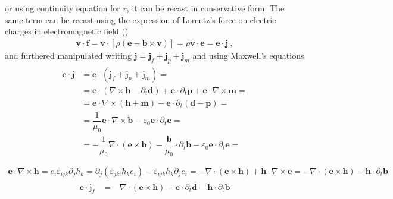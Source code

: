 \documentclass[letterpaper,10pt,italian]{jupyterBook}
\begin{document}
\sphinxAtStartPar
or using continuity equation for \(r\), it can be recast in conservative form. The same term can be recast using the expression of Lorentz’s force on electric charges in electromagnetic field ()
\begin{equation*}
\begin{split}\mathbf{v} \cdot \mathbf{f} = \mathbf{v} \cdot \left[ \rho ( \mathbf{e} - \mathbf{b} \times \mathbf{v} ) \right] = \rho \mathbf{v} \cdot \mathbf{e} = \mathbf{e} \cdot \mathbf{j} \ ,\end{split}
\end{equation*}
\sphinxAtStartPar
and furthered manipulated writing \(\mathbf{j} = \mathbf{j}_f + \mathbf{j}_p + \mathbf{j}_m\) and using Maxwell’s equations
\begin{equation*}
\begin{split}\begin{aligned}
  \mathbf{e} \cdot \mathbf{j} 
  & = \mathbf{e} \cdot \left( \mathbf{j}_f + \mathbf{j}_p + \mathbf{j}_m \right) = \\
  & = \mathbf{e} \cdot \left( \nabla \times \mathbf{h} - \partial_t \mathbf{d} \right) + \mathbf{e} \cdot \partial_t \mathbf{p} + \mathbf{e} \cdot \nabla \times \mathbf{m} = \\
  & = \mathbf{e} \cdot \nabla \times \left( \mathbf{h} + \mathbf{m} \right) - \mathbf{e} \cdot \partial_t \left( \mathbf{d} - \mathbf{p} \right)  = \\
  & = \dfrac{1}{\mu_0} \mathbf{e} \cdot \nabla \times \mathbf{b} - \varepsilon_0 \mathbf{e} \cdot \partial_t \mathbf{e} = \\
  & = - \dfrac{1}{\mu_0} \nabla \cdot \left( \mathbf{e} \times \mathbf{b} \right) - \dfrac{\mathbf{b}}{\mu_0} \cdot \partial_t \mathbf{b} - \varepsilon_0 \mathbf{e} \cdot \partial_t \mathbf{e} = \\
\end{aligned}\end{split}
\end{equation*}\begin{equation*}
\begin{split}\mathbf{e} \cdot \nabla \times \mathbf{h} = e_i \varepsilon_{ijk} \partial_j h_k = \partial_j \left( \varepsilon_{jki} h_k e_i \right) - \varepsilon_{ijk} h_k \partial_j e_i = - \nabla \cdot (\mathbf{e} \times \mathbf{h} ) + \mathbf{h} \cdot \nabla \times \mathbf{e} = - \nabla \cdot (\mathbf{e} \times \mathbf{h} ) - \mathbf{h} \cdot \partial_t \mathbf{b}\end{split}
\end{equation*}\begin{equation*}
\begin{split}\begin{aligned}
  \mathbf{e} \cdot \mathbf{j}_f & = - \nabla \cdot ( \mathbf{e} \times \mathbf{h} ) - \mathbf{e} \cdot \partial_t \mathbf{d} - \mathbf{h} \cdot \partial_t \mathbf{b}
\end{aligned}\end{split}
\end{equation*}
\end{document}

